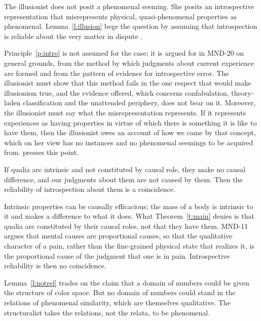 \documentclass{situationist-preprint}
\begin{document}
\begin{objection}\label{o:frankish}
The illusionist does not posit a phenomenal seeming. She posits an introspective representation that misrepresents physical, quasi-phenomenal properties as phenomenal. Lemma~\ref{l:illusion} begs the question by assuming that introspection is reliable about the very matter in dispute \citep{Frankish2016}.
\end{objection}

\begin{reply}
Principle~\ref{p:intro} is not assumed for the case; it is argued for in MND-20 on general grounds, from the method by which judgments about current experience are formed and from the pattern of evidence for introspective error. The illusionist must show that this method fails in the one respect that would make illusionism true, and the evidence offered, which concerns confabulation, theory-laden classification and the unattended periphery, does not bear on it. Moreover, the illusionist must say what the misrepresentation represents. If it represents experiences as having properties in virtue of which there is something it is like to have them, then the illusionist owes an account of how we came by that concept, which on her view has no instances and no phenomenal seemings to be acquired from. \citet{Balog2016} presses this point.
\end{reply}

\begin{objection}[Epiphenomenalism]\label{o:epi}
If qualia are intrinsic and not constituted by causal role, they make no causal difference, and our judgments about them are not caused by them. Then the reliability of introspection about them is a coincidence.
\end{objection}

\begin{reply}
Intrinsic properties can be causally efficacious; the mass of a body is intrinsic to it and makes a difference to what it does. What Theorem~\ref{t:main} denies is that qualia are constituted by their causal roles, not that they have them. MND-11 argues that mental causes are proportional causes, so that the qualitative character of a pain, rather than the fine-grained physical state that realizes it, is the proportional cause of the judgment that one is in pain. Introspective reliability is then no coincidence.
\end{reply}

\begin{objection}[Structuralism]\label{o:struct}
Lemma~\ref{l:notrel} trades on the claim that a domain of numbers could be given the structure of color space. But no domain of numbers could stand in the relations of phenomenal similarity, which are themselves qualitative. The structuralist takes the relations, not the relata, to be phenomenal.
\end{objection}
\end{document}
